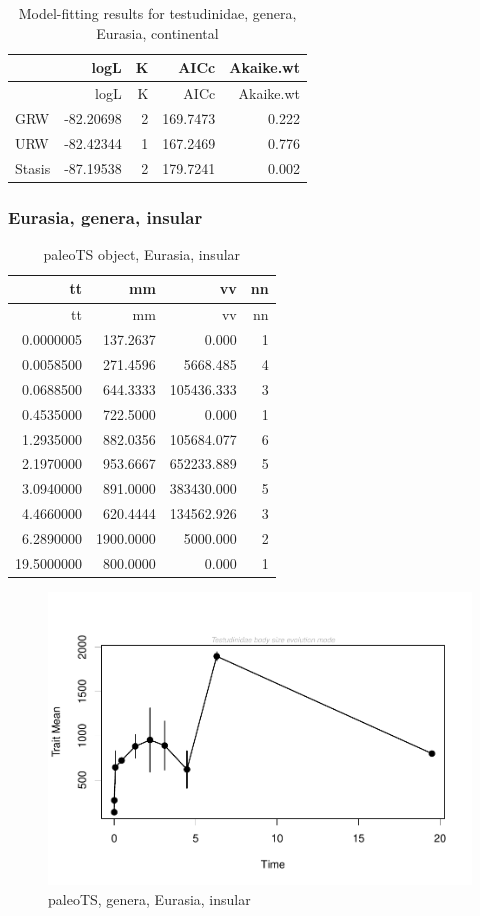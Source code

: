 \begin{longtable}[]{@{}lrrrr@{}}
	\caption{Model-fitting results for testudinidae, genera, Eurasia,
		continental}
	\label{tab:pTSEsCEM}\tabularnewline
	\toprule
	& logL & K & AICc & Akaike.wt\tabularnewline
	\midrule
	\endfirsthead
	\toprule
	& logL & K & AICc & Akaike.wt\tabularnewline
	\midrule
	\endhead
	GRW & -82.20698 & 2 & 169.7473 & 0.222\tabularnewline
	URW & -82.42344 & 1 & 167.2469 & 0.776\tabularnewline
	Stasis & -87.19538 & 2 & 179.7241 & 0.002\tabularnewline
	\bottomrule
\end{longtable}



\FloatBarrier
\subsubsection{Eurasia, genera,
	insular}\label{eurasiagenera-insular}

\begin{longtable}[]{@{}rrrr@{}}
	\caption{paleoTS object, Eurasia, insular}
	\label{tab:pTSEsI}\tabularnewline
	\toprule
	tt & mm & vv & nn\tabularnewline
	\midrule
	\endfirsthead
	\toprule
	tt & mm & vv & nn\tabularnewline
	\midrule
	\endhead
	0.0000005 & 137.2637 & 0.000 & 1\tabularnewline
	0.0058500 & 271.4596 & 5668.485 & 4\tabularnewline
	0.0688500 & 644.3333 & 105436.333 & 3\tabularnewline
	0.4535000 & 722.5000 & 0.000 & 1\tabularnewline
	1.2935000 & 882.0356 & 105684.077 & 6\tabularnewline
	2.1970000 & 953.6667 & 652233.889 & 5\tabularnewline
	3.0940000 & 891.0000 & 383430.000 & 5\tabularnewline
	4.4660000 & 620.4444 & 134562.926 & 3\tabularnewline
	6.2890000 & 1900.0000 & 5000.000 & 2\tabularnewline
	19.5000000 & 800.0000 & 0.000 & 1\tabularnewline
	\bottomrule
\end{longtable}

\begin{figure}[htbp]
	\centering
	\includegraphics{MA_JJ_files/figure-latex/pTSEsI-1.pdf}
	\caption{paleoTS, genera, Eurasia, insular}
	\label{fig:pTSEsI}
\end{figure}

